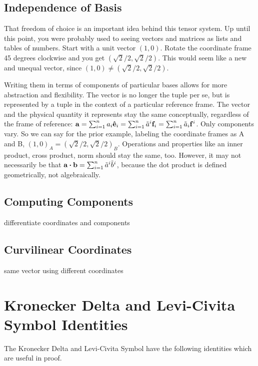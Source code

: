 \subsection{Independence of Basis}

That freedom of choice is an important idea behind this tensor system. Up until this point, you were probably used to seeing vectors and matrices as lists and tables of numbers. Start with a unit vector $(1, 0)$. Rotate the coordinate frame 45 degrees clockwise and you get $(\sqrt{2} / 2, \sqrt{2} / 2)$. This would seem like a new and unequal vector, since $(1, 0) \neq (\sqrt{2} / 2, \sqrt{2} / 2)$.

Writing them in terms of components of particular bases allows for more abstraction and flexibility. The vector is no longer the tuple per se, but is represented by a tuple in the context of a particular reference frame. The vector and the physical quantity it represents stay the same conceptually, regardless of the frame of reference: $\vb{a} = \sum_{i = 1}^{n} a_{i} \vu{e}_{i} = \sum_{i = 1}^{n} \tilde{a}^{i} \vb{f}_{i} = \sum_{i = 1}^{n} \tilde{a}_{i} \vb{f}^{i}$. Only components vary. So we can say for the prior example, labeling the coordinate frames as A and B, $(1, 0)_{A} = (\sqrt{2} / 2, \sqrt{2} / 2)_{B}$. Operations and properties like an inner product, cross product, norm should stay the same, too. However, it may not necessarily be that $\vb{a} \vdot \vb{b} = \sum_{i = 1}^{n} \tilde{a}^{i} \tilde{b}^{i}$, because the dot product is defined geometrically, not algebraically.

\subsection{Computing Components}

differentiate coordinates and components

\subsection{Curvilinear Coordinates}

same vector using different coordinates

\section{Kronecker Delta and Levi-Civita Symbol Identities}

The Kronecker Delta and Levi-Civita Symbol have the following identities which are useful in proof.

